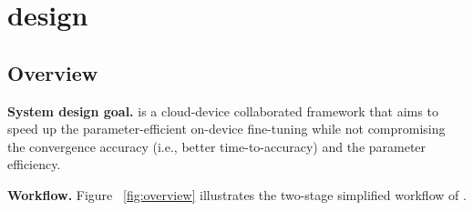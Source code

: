 \section{\sys design}
\subsection{Overview}



\noindent \textbf{System design goal.}
\sys is a cloud-device collaborated framework that aims to speed up the parameter-efficient on-device fine-tuning while not compromising the convergence accuracy (i.e., better time-to-accuracy) and the parameter efficiency.


\noindent \textbf{Workflow.}
Figure ~\ref{fig:overview} illustrates the two-stage simplified workflow of \sys.


